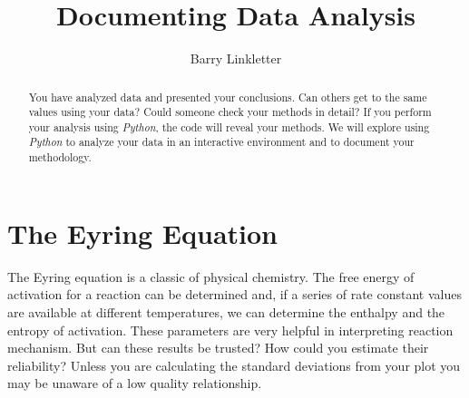 \documentclass{tufte-handout}
\title{Documenting Data Analysis}
\author[Barry Linkletter]{Barry Linkletter}
\date{} %
\begin{document}
\justifying


\maketitle%

\begin{abstract}
You have analyzed data and presented your conclusions. Can others get to the same values using your data? Could someone check your methods in detail? If you perform your analysis using \textit{Python}, the code will reveal your methods. We will explore using \textit{Python} to analyze your data in an interactive environment and to document your methodology.
\noindent {}

\end{abstract}


\section{The Eyring Equation}

The Eyring equation is a classic of physical chemistry.
 The free energy of activation for a reaction can be determined and, if a series of rate constant values are available at different temperatures, we can determine the enthalpy and the entropy of activation. These parameters are very helpful in interpreting reaction mechanism. But can these results be trusted? How could you estimate their reliability? Unless you are calculating the standard deviations from your plot you may be unaware of a low quality relationship.
\end{document}
